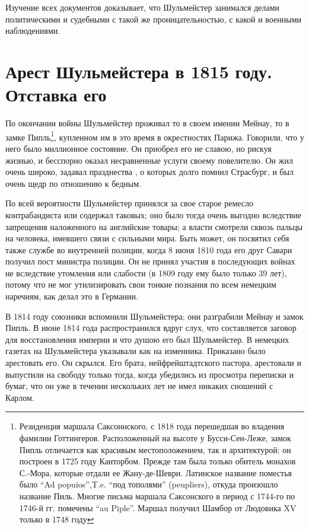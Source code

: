 \documentclass[
  oneside,
  12pt,
  titlepage]{book}
\begin{document}
Изучение всех документов доказывает, что Шульмейстер занимался делами политическими и судебными с такой же проницательностью, с какой и военными наблюдениями.

\hypertarget{ux430ux440ux435ux441ux442-ux448ux443ux43bux44cux43cux435ux439ux441ux442ux435ux440ux430-ux432-1815-ux433ux43eux434ux443.-ux43eux442ux441ux442ux430ux432ux43aux430-ux435ux433ux43e}{%
\chapter{Арест Шульмейстера в 1815 году. Отставка его}\label{ux430ux440ux435ux441ux442-ux448ux443ux43bux44cux43cux435ux439ux441ux442ux435ux440ux430-ux432-1815-ux433ux43eux434ux443.-ux43eux442ux441ux442ux430ux432ux43aux430-ux435ux433ux43e}}

По окончании войны Шульмейстер проживал то в своем имении Мейнау, то в замке Пипль\footnote{Резиденция маршала Саксоннского, с 1818 года перешедшая во владения фамилии Готтингеров. Расположенный на высоте у Бусси-Сен-Леже, замок Пипль отличается как красивым местоположением, так и архитектурой; он построен в 1725 году Канторбом. Прежде там была только обитель монахов С.-Мора, которые отдали ее Жану-де-Шеври. Латинское название поместья было ``Ad popuios'',T.e. ``под тополями'' (peupliers), откуда произошло название Пиль. Многие письма маршала Саксонского в период с 1744-го по 1746-й гг. помечены ``au Piple''. Маршал получил Шамбор от Людовика XV только в 1748 году}, купленном им в это время в окрестностях Парижа. Говорили, что у него было миллионное состояние. Он приобрел его не славою, но рискуя жизнью, и бесспорно оказал несравненные услуги своему повелителю. Он жил очень широко, задавал празднества , о которых долго помнил Страсбург, и был очень щедр по отношению к бедным.

По всей вероятности Шульмейстер принялся за свое старое ремесло контрабандиста или содержал таковых; оно было тогда очень выгодно вследствие запрещения наложенного на английские товары; а власти смотрели сквозь пальцы на человека, имевшего связи с сильными мира. Быть может, он посвятил себя также службе во внутренней полиции, когда 8 июня 1810 года его друг Савари получил пост министра полиции. Он не принял участия в последующих войнах не вследствие утомления или слабости (в 1809 году ему было только 39 лет), потому что не мог утилизировать свои тонкие познания по всем немецким наречиям, как делал это в Германии.

В 1814 году союзники вспомнили Шульмейстера; они разграбили Мейнау и замок Пипль. В июне 1814 года распространился вдруг слух, что составляется заговор для восстановления империи и что душою его был Шульмейстер. В немецких газетах на Шульмейстера указывали как на изменника. Приказано было арестовать его. Он скрылся. Его брата, нейфрейштадтского пастора, арестовали и выпустили на свободу только тогда, когда убедились из просмотра переписки и бумаг, что он уже в течении нескольких лет не имел никаких сношений с Карлом.
\end{document}
